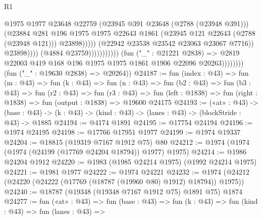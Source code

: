\begin{lexlean}{R1}
\begin{coremodule}
                                                          @1975
                                                          @1977
                                                          @23648
                                                          @22759
                                                          (@23945 @391 @23648 (@2788 (@23948 @391)))
                                                          (@23884
                                                            @281
                                                            @196
                                                            @1975
                                                            @1975
                                                            @22643
                                                            @1861
                                                            (@23945
                                                              @121
                                                              @22643
                                                              (@2788 (@23948 @121)))
                                                            @23898)))))
                                                  (@22942 @23538 @23542 @23063 @23067 @7716))
                                                @23898))))
                                        (@4884 @23759)))))))))))
                    (fun ("_" : @21221 @2838) =>
                    @2819 @22003 @419 @168 @196 @1975 @1975 @1861 @1906 @22096 @20263))))))))
      (fun ("_" : @19630 @2838) => @20264))
@24187 := fun (index : @43) =>
  fun (m : @43) =>
  fun (k : @43) =>
  fun (n : @43) =>
  fun (b2 : @43) =>
  fun (b3 : @43) =>
  fun (r2 : @43) =>
  fun (r3 : @43) =>
  fun (left : @1838) => fun (right : @1838) => fun (output : @1838) => @19600 @24175
@24193 := («at» : @43) ->
  (base : @43) -> (k : @43) -> (kind : @43) -> (lanes : @43) -> (blockStride : @43) -> @1885
@24194 := @4174 @1891
@24195 := @17754 @24194
@24196 := @1974 @24195
@24198 := @17766 @17951 @1977
@24199 := @1974 @19337
@24204 := @18815 (@19319 @7167 @1912 @75) @80
@24212 := @1974 (@1974 (@1974 (@24199 (@17769 @24204 @18794)) @1977) @1975)
@24214 := @1986 @24204 @1912
@24220 := @1983 (@1985 @24214 @1975) (@1992 @24214 @1975)
@24221 := @1981 @1977
@24222 := @1974 @24221
@24232 := @1974 (@24212 (@24220 (@24222 (@17769 (@18787 (@19960 @80) @1912) @18794)) @1975))
@24240 := @18787 (@19348 (@19348 @7167 @1912 @75) @1891 @75) @1874
@24277 := fun («at» : @43) =>
  fun (base : @43) =>
  fun (k : @43) =>
  fun (kind : @43) =>
  fun (lanes : @43) =>

\end{coremodule}
\end{lexlean}
